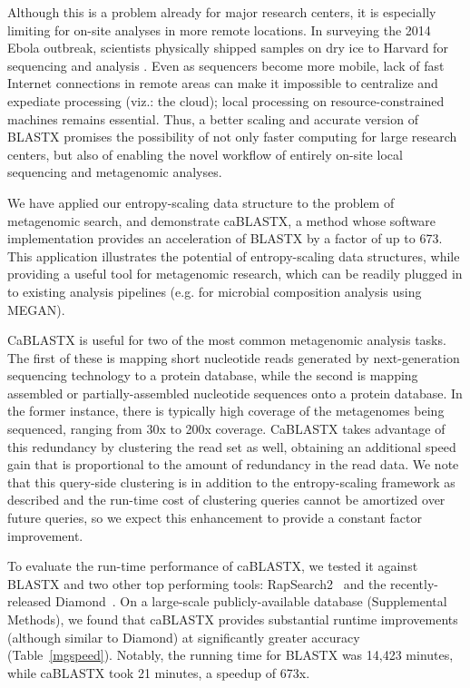 \documentclass[review,preprint,12pt]{elsarticle}
\renewcommand{\cite}{\citep} %
\theoremstyle{definition}
\theoremstyle{remark}
\numberwithin{equation}{section}
\begin{document}
Although this is a problem already for major research centers, it is especially
limiting for on-site analyses in more remote locations.
In surveying the 2014 Ebola outbreak, scientists physically shipped samples on 
dry ice to Harvard for sequencing and analysis \cite{gire2014genomic}.
Even as sequencers become more mobile, lack of fast Internet connections in remote
areas can make it impossible to centralize and expediate processing (viz.: the cloud);
local processing on resource-constrained machines remains essential.
Thus, a better scaling and accurate version of BLASTX promises the possibility of not only faster computing for
large research centers, but also of enabling the novel workflow of
entirely on-site local sequencing and metagenomic analyses.

We have applied our entropy-scaling data structure to the problem of 
metagenomic search, and demonstrate caBLASTX, a method whose software 
implementation provides an acceleration of BLASTX by a factor of up 
to 673.
This application illustrates the potential of entropy-scaling data structures, while
providing a useful tool for metagenomic research, which can be readily plugged in to existing analysis pipelines (e.g. for microbial composition analysis using MEGAN).

CaBLASTX is useful for two of the most common metagenomic analysis tasks. 
The first of these is mapping short nucleotide reads generated by next-generation sequencing technology to a protein database,
while the second is mapping assembled or partially-assembled
nucleotide sequences onto a protein database.
In the former instance, there is typically high coverage of the metagenomes
being sequenced, ranging from 30x to 200x coverage.
CaBLASTX takes advantage of this redundancy
by clustering the read set as well, obtaining an additional speed gain that is
proportional to the amount of redundancy in the read data.
We note that this query-side clustering is in addition to the entropy-scaling
framework as described and the run-time cost of clustering queries cannot
be amortized over future queries, so
we expect this enhancement to provide a 
constant factor improvement.

To evaluate the run-time performance of caBLASTX, we tested it against
BLASTX and two other top performing tools: RapSearch2~\cite{zhao2012rapsearch2} and the recently-released
Diamond~\cite{buchfink2014fast}.
On a large-scale publicly-available database (Supplemental Methods), we found that caBLASTX provides substantial runtime improvements 
(although similar to Diamond) at significantly greater accuracy (Table~\ref{mgspeed}).
Notably, the running time for BLASTX was 14,423 minutes, 
while caBLASTX took 21 minutes, a speedup of 673x.
\end{document}
